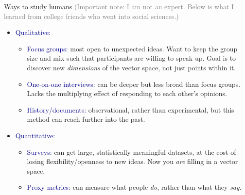 \documentclass[aspectratio=169]{beamer}
\begin{document}
\begin{frame}{Ways to study humans}
\vspace{0.1 cm}
\textcolor{gray}{\scriptsize (Important note: I am not an expert. Below is what I learned from college friends who went into social sciences.)}

\large
\vspace{0.1 cm}
\begin{itemize}\setlength{\itemsep}{0.25 cm}
\item \textcolor{darkblue}{Qualitative:}

\vspace{0.05 cm}
\begin{itemize}\large\setlength{\itemsep}{0.15 cm}
\item \textcolor{darkblue}{Focus groups:} \normalsize most open to unexpected ideas. Want to keep the group size and mix such that participants are willing to speak up. Goal is to discover new {\it dimensions} of the vector space, not just points within it. \large

\item \textcolor{darkblue}{One-on-one interviews:} \normalsize can be deeper but less broad than focus groups. Lacks the multiplying effect of responding to each other's opinions. \large

\item \textcolor{darkblue}{History/documents:} \normalsize observational, rather than experimental, but this method can reach further into the past. \large
\end{itemize}

\item \textcolor{darkblue}{Quantitative:}

\vspace{0.05 cm}
\begin{itemize}\large\setlength{\itemsep}{0.15 cm}
\item \textcolor{darkblue}{Surveys:} \normalsize can get large, statistically meaningful datasets, at the cost of losing flexibility/openness to new ideas. Now you {\it are} filling in a vector space. \large

\item \textcolor{darkblue}{Proxy metrics:} \normalsize can measure what people {\it do}, rather than what they {\it say}. \large
\end{itemize}

\end{itemize}
\end{frame}
\end{document}
